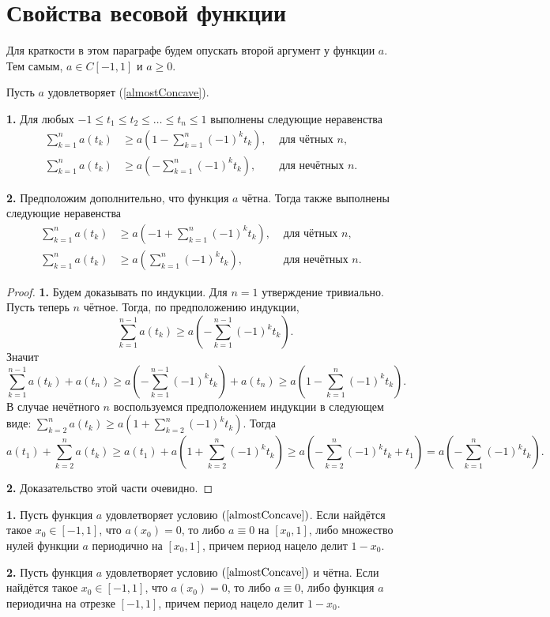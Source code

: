 \section{Свойства весовой функции}


Для краткости в этом параграфе будем опускать второй аргумент у функции $a$.
Тем самым, $a \in C[-1, 1]$ и $a \ge 0$.

\begin{lm}
\label{weightSum}
Пусть $a$ удовлетворяет (\ref{almostConcave}).

\textbf{1.}
Для любых $-1 \le t_1 \le t_2 \le \ldots \le t_n \le 1$ выполнены следующие неравенства
\begin{align*}
\sum_{k = 1}^n a(t_k) & \ge a( 1 - \sum_{k = 1}^n (-1)^k t_k), & \text{ для чётных $n$}, & \\
\sum_{k = 1}^n a(t_k) & \ge a(- \sum_{k = 1}^n (-1)^k t_k), & \text{ для нечётных $n$}. &
\end{align*}

\textbf{2.}
Предположим дополнительно, что функция $a$ чётна.
Тогда также выполнены следующие неравенства
\begin{align*}
\sum_{k = 1}^n a(t_k) & \ge a(-1 + \sum_{k = 1}^n (-1)^k t_k), & \text{ для чётных $n$}, & \\
\sum_{k = 1}^n a(t_k) & \ge a(\sum_{k = 1}^n (-1)^k t_k), & \text{ для нечётных $n$}. &
\end{align*}
\end{lm}

\begin{proof}
\textbf{1.}
Будем доказывать по индукции.
Для $n = 1$ утверждение тривиально.
Пусть теперь $n$ чётное.
Тогда, по предположению индукции,
$$\sum_{k=1}^{n - 1} a(t_k) \ge a( -\sum_{k = 1}^{n - 1} (-1)^k t_k ).$$
Значит
$$\sum_{k = 1}^{n - 1} a( t_k ) + a( t_n ) \ge a( -\sum_{k = 1}^{n - 1} (-1)^k t_k ) + a( t_n ) \ge
a( 1 - \sum_{k = 1}^{n} (-1)^k t_k ).$$
В случае нечётного $n$ воспользуемся предположением индукции в следующем виде:
$\sum_{k=2}^n a(t_k) \ge a( 1 + \sum_{k = 2}^n (-1)^k t_k )$.
Тогда
$$
a( t_1 ) + \sum_{k = 2}^n a( t_k ) \ge a( t_1 ) + a( 1 + \sum_{k = 2}^{n} (-1)^k t_k ) \ge
a( -\sum_{k = 2}^{n} (-1)^k t_k + t_1 ) = a( -\sum_{k = 1}^{n} (-1)^k t_k ).
$$

\textbf{2.} Доказательство этой части очевидно.
\end{proof}

\begin{lm}
\label{periodicity}
\textbf{1.}
Пусть функция $a$ удовлетворяет условию $(\ref{almostConcave})$.
Если найдётся такое $x_0 \in [-1, 1]$, что $a(x_0) = 0$,
то либо $a \equiv 0$ на $[x_0, 1]$,
либо множество нулей функции $a$ периодично на $[x_0, 1]$, причем период нацело делит $1 - x_0$.

\textbf{2.}
Пусть функция $a$ удовлетворяет условию $(\ref{almostConcave})$ и чётна.
Если найдётся такое $x_0 \in [-1, 1]$, что $a(x_0) = 0$,
то либо $a \equiv 0$,
либо функция $a$ периодична на отрезке $[-1, 1]$, причем период нацело делит $1 - x_0$.
\end{lm}

